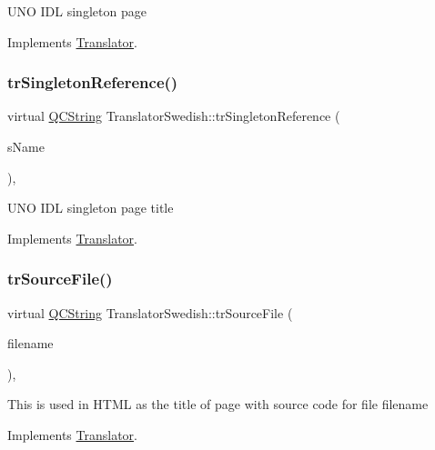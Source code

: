 U\+NO I\+DL singleton page 

Implements \mbox{\hyperlink{class_translator}{Translator}}.

\mbox{\label{class_translator_swedish_a8308ddb8bef03268d199915925755ee0}} 
\subsubsection{\texorpdfstring{trSingletonReference()}{trSingletonReference()}}
{\footnotesize\ttfamily virtual \mbox{\hyperlink{class_q_c_string}{Q\+C\+String}} Translator\+Swedish\+::tr\+Singleton\+Reference (\begin{DoxyParamCaption}\item[{const char $\ast$}]{s\+Name }\end{DoxyParamCaption})\hspace{0.3cm}{\ttfamily [inline]}, {\ttfamily [virtual]}}

U\+NO I\+DL singleton page title 

Implements \mbox{\hyperlink{class_translator}{Translator}}.

\mbox{\label{class_translator_swedish_a8bc42cb7f7a95e652eaad1a02653171c}} 
\subsubsection{\texorpdfstring{trSourceFile()}{trSourceFile()}}
{\footnotesize\ttfamily virtual \mbox{\hyperlink{class_q_c_string}{Q\+C\+String}} Translator\+Swedish\+::tr\+Source\+File (\begin{DoxyParamCaption}\item[{\mbox{\hyperlink{class_q_c_string}{Q\+C\+String}} \&}]{filename }\end{DoxyParamCaption})\hspace{0.3cm}{\ttfamily [inline]}, {\ttfamily [virtual]}}

This is used in H\+T\+ML as the title of page with source code for file filename 

Implements \mbox{\hyperlink{class_translator}{Translator}}.

